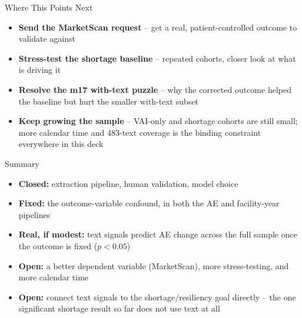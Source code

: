 \documentclass[aspectratio=169,10pt]{beamer}
\begin{document}
\begin{frame}{Where This Points Next}
\begin{itemize}
  \setlength{\itemsep}{9pt}
  \item \textbf{Send the MarketScan request} -- get a real, patient-controlled
        outcome to validate against
  \item \textbf{Stress-test the shortage baseline} -- repeated cohorts, closer
        look at what is driving it
  \item \textbf{Resolve the m17 with-text puzzle} -- why the corrected outcome
        helped the baseline but hurt the smaller with-text subset
  \item \textbf{Keep growing the sample} -- VAI-only and shortage cohorts are
        still small; more calendar time and 483-text coverage is the binding
        constraint everywhere in this deck
\end{itemize}
\end{frame}

\begin{frame}{Summary}
\begin{itemize}
  \setlength{\itemsep}{9pt}
  \item \textbf{Closed:} extraction pipeline, human validation, model choice
  \item \textbf{Fixed:} the outcome-variable confound, in both the AE and
        facility-year pipelines
  \item \textbf{Real, if modest:} text signals predict AE change across the full
        sample once the outcome is fixed ($p<0.05$)
  \item \textbf{Open:} a better dependent variable (MarketScan), more stress-testing,
        and more calendar time
  \item \textbf{Open:} connect text signals to the shortage/resiliency goal
        directly -- the one significant shortage result so far does not use
        text at all
\end{itemize}
\end{frame}
\end{document}
